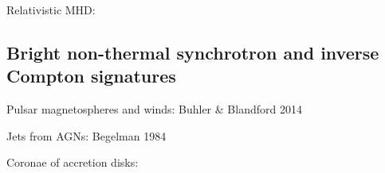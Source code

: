 \documentclass[usenatbib,twocolumn, twocolappendix]{aastex63}
\begin{document}
\begin{appendix}
Relativistic MHD:
\citep{Zrake_2012}
\citep{Zrake_2014}

\subsection{Bright non-thermal synchrotron and inverse Compton signatures}
Pulsar magnetospheres and winds:
Buhler \& Blandford 2014

Jets from AGNs: Begelman 1984

Coronae of accretion disks:
\citep{Yuan_2014}


%
%
%
% 
%
%



\end{appendix}
\end{document}
